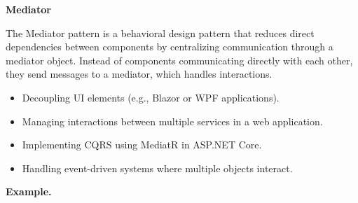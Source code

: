 \medskip
\begin{center}
\textbf{Mediator}
\end{center}

The Mediator pattern is a behavioral design pattern that reduces direct dependencies between components by centralizing communication through a mediator object. Instead of components communicating directly with each other, they send messages to a mediator, which handles interactions.

\begin{itemize}
\item Decoupling UI elements (e.g., Blazor or WPF applications).

\item Managing interactions between multiple services in a web application.

\item Implementing CQRS using MediatR in ASP.NET Core.

\item Handling event-driven systems where multiple objects interact.


\end{itemize}

\textbf{Example.}

